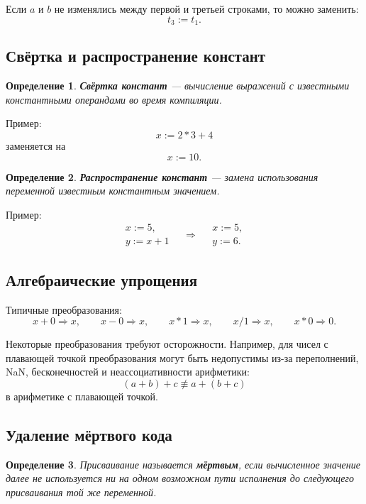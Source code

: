 \documentclass[12pt,a4paper]{article}
\newtheorem{definition}{Определение}
\begin{document}
Если $a$ и $b$ не изменялись между первой и третьей строками, то можно заменить:
\[
t_3 := t_1.
\]

\subsection{Свёртка и распространение констант}

\begin{definition}
\textbf{Свёртка констант} --- вычисление выражений с известными константными операндами во время компиляции.
\end{definition}

Пример:
\[
x := 2 * 3 + 4
\]
заменяется на
\[
x := 10.
\]

\begin{definition}
\textbf{Распространение констант} --- замена использования переменной известным константным значением.
\end{definition}

Пример:
\[
\begin{array}{l}
x := 5,\\
y := x + 1
\end{array}
\quad \Longrightarrow \quad
\begin{array}{l}
x := 5,\\
y := 6.
\end{array}
\]

\subsection{Алгебраические упрощения}

Типичные преобразования:
\[
x + 0 \Rightarrow x,
\qquad
x - 0 \Rightarrow x,
\qquad
x * 1 \Rightarrow x,
\qquad
x / 1 \Rightarrow x,
\qquad
x * 0 \Rightarrow 0.
\]

Некоторые преобразования требуют осторожности. Например, для чисел с плавающей точкой преобразования могут быть недопустимы из-за переполнений, NaN, бесконечностей и неассоциативности арифметики:
\[
(a+b)+c \not\equiv a+(b+c)
\]
в арифметике с плавающей точкой.

\subsection{Удаление мёртвого кода}

\begin{definition}
Присваивание называется \textbf{мёртвым}, если вычисленное значение далее не используется ни на одном возможном пути исполнения до следующего присваивания той же переменной.
\end{definition}
\end{document}
